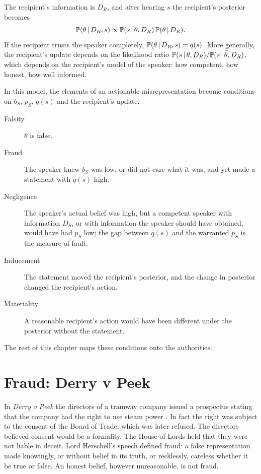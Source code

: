 The recipient's information is $D_R$, and after hearing $s$ the recipient's posterior becomes
\begin{equation}
\mathbb{P}(\theta\,\vert\, D_R, s) \propto \mathbb{P}(s \,\vert\, \theta, D_R)\,\mathbb{P}(\theta\,\vert\, D_R).
\end{equation}
If the recipient trusts the speaker completely, $\mathbb{P}(\theta\,\vert\, D_R,s) = q(s)$. More generally, the recipient's update depends on the likelihood ratio $\mathbb{P}(s\,\vert\,\theta,D_R)/\mathbb{P}(s\,\vert\,\bar\theta,D_R)$, which depends on the recipient's model of the speaker: how competent, how honest, how well informed.

In this model, the elements of an actionable misrepresentation become conditions on $b_S$, $p_S$, $q(s)$ and the recipient's update.
\begin{description}
\item[Falsity] $\theta$ is false.
\item[Fraud] The speaker knew $b_S$ was low, or did not care what it was, and yet made a statement with $q(s)$ high.
\item[Negligence] The speaker's actual belief was high, but a competent speaker with information $D_S$, or with information the speaker should have obtained, would have had $p_S$ low; the gap between $q(s)$ and the warranted $p_S$ is the measure of fault.
\item[Inducement] The statement moved the recipient's posterior, and the change in posterior changed the recipient's action.
\item[Materiality] A reasonable recipient's action would have been different under the posterior without the statement.
\end{description}
The rest of this chapter maps these conditions onto the authorities.

\section{Fraud: Derry v Peek}

In \emph{Derry v Peek} the directors of a tramway company issued a prospectus stating that the company had the right to use steam power \citep{derry1889}. In fact the right was subject to the consent of the Board of Trade, which was later refused. The directors believed consent would be a formality. The House of Lords held that they were not liable in deceit. Lord Herschell's speech defined fraud: a false representation made knowingly, or without belief in its truth, or recklessly, careless whether it be true or false. An honest belief, however unreasonable, is not fraud.


